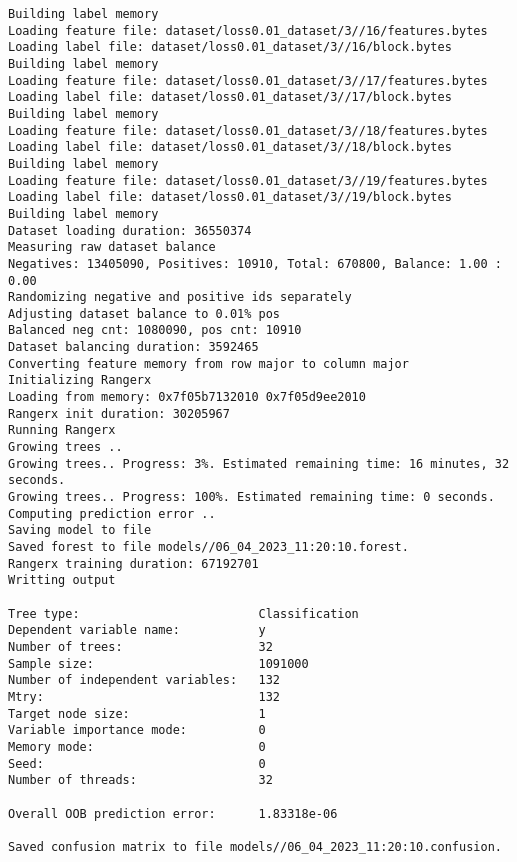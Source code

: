 \documentclass[12pt,oneside]{book}
\begin{document}
\begin{lstlisting}
Building label memory
Loading feature file: dataset/loss0.01_dataset/3//16/features.bytes
Loading label file: dataset/loss0.01_dataset/3//16/block.bytes
Building label memory
Loading feature file: dataset/loss0.01_dataset/3//17/features.bytes
Loading label file: dataset/loss0.01_dataset/3//17/block.bytes
Building label memory
Loading feature file: dataset/loss0.01_dataset/3//18/features.bytes
Loading label file: dataset/loss0.01_dataset/3//18/block.bytes
Building label memory
Loading feature file: dataset/loss0.01_dataset/3//19/features.bytes
Loading label file: dataset/loss0.01_dataset/3//19/block.bytes
Building label memory
Dataset loading duration: 36550374
Measuring raw dataset balance
Negatives: 13405090, Positives: 10910, Total: 670800, Balance: 1.00 : 0.00
Randomizing negative and positive ids separately
Adjusting dataset balance to 0.01% pos
Balanced neg cnt: 1080090, pos cnt: 10910
Dataset balancing duration: 3592465
Converting feature memory from row major to column major
Initializing Rangerx
Loading from memory: 0x7f05b7132010 0x7f05d9ee2010
Rangerx init duration: 30205967
Running Rangerx
Growing trees ..
Growing trees.. Progress: 3%. Estimated remaining time: 16 minutes, 32 seconds.
Growing trees.. Progress: 100%. Estimated remaining time: 0 seconds.
Computing prediction error ..
Saving model to file
Saved forest to file models//06_04_2023_11:20:10.forest.
Rangerx training duration: 67192701
Writting output

Tree type:                         Classification
Dependent variable name:           y
Number of trees:                   32
Sample size:                       1091000
Number of independent variables:   132
Mtry:                              132
Target node size:                  1
Variable importance mode:          0
Memory mode:                       0
Seed:                              0
Number of threads:                 32

Overall OOB prediction error:      1.83318e-06

Saved confusion matrix to file models//06_04_2023_11:20:10.confusion.
\end{lstlisting}
\end{document}
